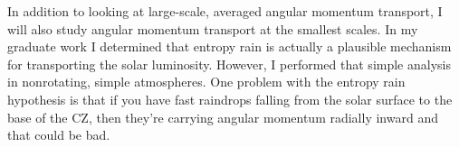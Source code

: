 \documentclass[aasms,12pt]{article}
\begin{document}
In addition to looking at large-scale, averaged angular momentum transport, I will also study angular momentum transport at the smallest scales.
In my graduate work I determined that entropy rain is actually a plausible mechanism for transporting the solar luminosity.
However, I performed that simple analysis in nonrotating, simple atmospheres.
One problem with the entropy rain hypothesis is that if you have fast raindrops falling from the solar surface to the base of the CZ, then they're carrying angular momentum radially inward and that could be bad.





\end{document}
